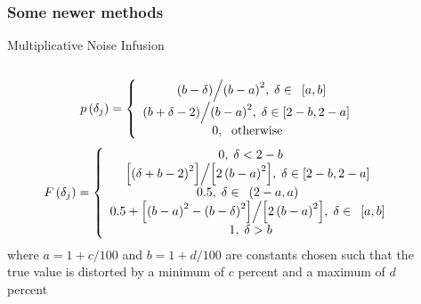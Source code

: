 \begin{frame}
	\frametitle{Some newer methods}
	\begin{block}{Multiplicative Noise Infusion}
		\begin{columns}
\begin{column}{0.7\textwidth}
	\footnotesize
\begin{equation*}
p\left( {\delta _{j}}\right) =\left\{ {{%
		\begin{array}{*{20}c} {\mbox{ }{\left( {b - \delta } \right)} \mathord{\left/ {\vphantom {{\left( {b - \delta } \right)} {\left( {b - a} \right)^2}}} \right. \kern-\nulldelimiterspace} {\left( {b - a} \right)^2},\;\delta \in \mbox{ 
				}\left[ {a,b} \right]} \\ {{\left( {b + \delta - 2} \right)} \mathord{\left/ {\vphantom {{\left( {b + \delta - 2} \right)} {\left( {b - a} \right)^2}}} \right. \kern-\nulldelimiterspace} {\left( {b - a} \right)^2},\;\delta \in \left[ {2 - b,2 - a} \right]\mbox{ }} \\ {0,\;\mbox{ otherwise }} \\ \end{array}%
				}}\right. 
\end{equation*}%
\begin{equation*}
				F\left( {\delta _{j}}\right) =\left\{ {{%
						\begin{array}{*{20}c} {\mbox{0},\;\delta < {2-b} } \\ {{\left[ {\left( {\delta + b - 2} \right)^2} \right]} \mathord{\left/ {\vphantom {{\left[ {\left( {\delta + b - 2} \right)^2} \right]} {\left[ {2\left( {b - a} \right)^2} \right]}}} \right. \kern-\nulldelimiterspace} {\left[ {2\left( {b - a} \right)^2} \right]},\;\delta \in \left[ {2 - b,2 - a} \right]\mbox{ }} \\ {\mbox{0.5}, \;\delta \in \mbox{ }\left( {2-a,a} \right)\mbox{ }} \\ {\mbox{0.5} + {\left[ {\left( {b - a} \right)^2 - \left( {b - \delta } \right)^2} \right]} \mathord{\left/ {\vphantom {{\left[ {\left( {b - a} \right)^2 - \left( {b - \delta } \right)^2} \right]} {\left[ {2\left( {b - a} \right)^2} \right]}}} \right. \kern-\nulldelimiterspace} {\left[ {2\left( {b - a} \right)^2} \right]},\;\delta \in \mbox{ }\left[ {a,b} \right]\mbox{ 
								}} \\ {\mbox{1}, \;\delta > {b} } \\ \end{array}}}\right. 
\end{equation*}%
\noindent where $a=1+{c}/{100}$ and $b=1+{d}/{100}$ are constants chosen
such that the true value is distorted by a minimum of $c$ percent and a
maximum of $d$ percent
\end{column}
\begin{column}{0.3\textwidth}
				

\end{column}
\end{columns}
\end{block}
\end{frame}
